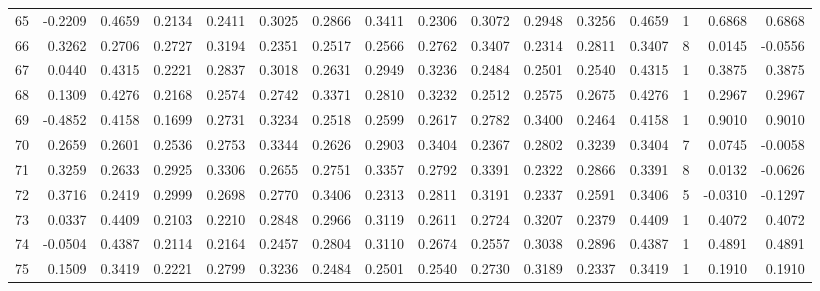 \begin{tabular}{lrrrrrrrrrrrrrrr}
65  &     -0.2209 &  0.4659 &  0.2134 &  0.2411 &  0.3025 &  0.2866 &  0.3411 &  0.2306 &  0.3072 &  0.2948 &   0.3256 &     0.4659 &      1 &                    0.6868 &                     0.6868 \\
66  &      0.3262 &  0.2706 &  0.2727 &  0.3194 &  0.2351 &  0.2517 &  0.2566 &  0.2762 &  0.3407 &  0.2314 &   0.2811 &     0.3407 &      8 &                    0.0145 &                    -0.0556 \\
67  &      0.0440 &  0.4315 &  0.2221 &  0.2837 &  0.3018 &  0.2631 &  0.2949 &  0.3236 &  0.2484 &  0.2501 &   0.2540 &     0.4315 &      1 &                    0.3875 &                     0.3875 \\
68  &      0.1309 &  0.4276 &  0.2168 &  0.2574 &  0.2742 &  0.3371 &  0.2810 &  0.3232 &  0.2512 &  0.2575 &   0.2675 &     0.4276 &      1 &                    0.2967 &                     0.2967 \\
69  &     -0.4852 &  0.4158 &  0.1699 &  0.2731 &  0.3234 &  0.2518 &  0.2599 &  0.2617 &  0.2782 &  0.3400 &   0.2464 &     0.4158 &      1 &                    0.9010 &                     0.9010 \\
70  &      0.2659 &  0.2601 &  0.2536 &  0.2753 &  0.3344 &  0.2626 &  0.2903 &  0.3404 &  0.2367 &  0.2802 &   0.3239 &     0.3404 &      7 &                    0.0745 &                    -0.0058 \\
71  &      0.3259 &  0.2633 &  0.2925 &  0.3306 &  0.2655 &  0.2751 &  0.3357 &  0.2792 &  0.3391 &  0.2322 &   0.2866 &     0.3391 &      8 &                    0.0132 &                    -0.0626 \\
72  &      0.3716 &  0.2419 &  0.2999 &  0.2698 &  0.2770 &  0.3406 &  0.2313 &  0.2811 &  0.3191 &  0.2337 &   0.2591 &     0.3406 &      5 &                   -0.0310 &                    -0.1297 \\
73  &      0.0337 &  0.4409 &  0.2103 &  0.2210 &  0.2848 &  0.2966 &  0.3119 &  0.2611 &  0.2724 &  0.3207 &   0.2379 &     0.4409 &      1 &                    0.4072 &                     0.4072 \\
74  &     -0.0504 &  0.4387 &  0.2114 &  0.2164 &  0.2457 &  0.2804 &  0.3110 &  0.2674 &  0.2557 &  0.3038 &   0.2896 &     0.4387 &      1 &                    0.4891 &                     0.4891 \\
75  &      0.1509 &  0.3419 &  0.2221 &  0.2799 &  0.3236 &  0.2484 &  0.2501 &  0.2540 &  0.2730 &  0.3189 &   0.2337 &     0.3419 &      1 &                    0.1910 &                     0.1910 \\

\end{tabular}
